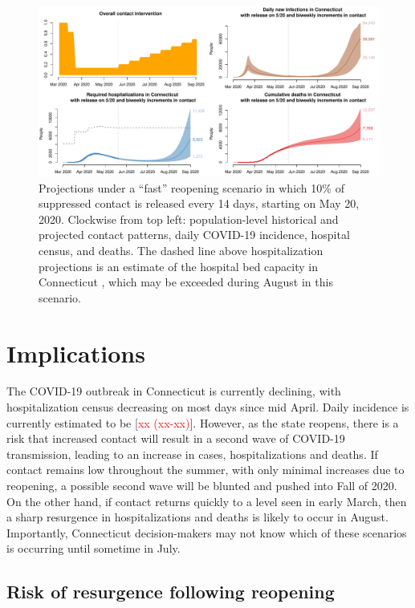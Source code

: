 \documentclass[11pt]{article}
\newcommand{\comment}[1]{[\textcolor{red}{#1}]}
\begin{document}
\begin{figure}
\centering
\includegraphics[width=\textwidth]{figures/fast.pdf}
\caption{Projections under a ``fast'' reopening scenario in which 10\% of suppressed contact is released every 14 days, starting on May 20, 2020.  Clockwise from top left: population-level historical and projected contact patterns, daily COVID-19 incidence, hospital census, and deaths. The dashed line above hospitalization projections is an estimate of the hospital bed capacity in Connecticut \citep{cha}, which may be exceeded during August in this scenario. }
\label{fig:fast}
\end{figure}




\section*{Implications}

The COVID-19 outbreak in Connecticut is currently declining, with hospitalization census decreasing on most days since mid April.  Daily incidence is currently estimated to be \comment{xx (xx-xx)}.  However, as the state reopens, there is a risk that increased contact will result in a second wave of COVID-19 transmission, leading to an increase in cases, hospitalizations and deaths.  If contact remains low throughout the summer, with only minimal increases due to reopening, a possible second wave will be blunted and pushed into Fall of 2020.  On the other hand, if contact returns quickly to a level seen in early March, then a sharp resurgence in hospitalizations and deaths is likely to occur in August.  Importantly, Connecticut decision-makers may not know which of these scenarios is occurring until sometime in July.  


\subsection*{Risk of resurgence following reopening} 
\end{document}
